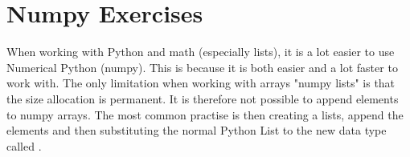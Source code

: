 \documentclass{article}
\begin{document}

%
%
%
%
%
%

\newpage


\section{Numpy Exercises}



When working with Python and math (especially lists), it is a lot easier to use Numerical Python (numpy).
This is because it is both easier and a lot faster to work with.
The only limitation when working with arrays "numpy lists" is that the size allocation is permanent.
It is therefore not possible to append elements to numpy arrays.
The most common practise is then creating a lists, append the elements and then substituting the normal Python List to the new data type called .\\
\end{document}
